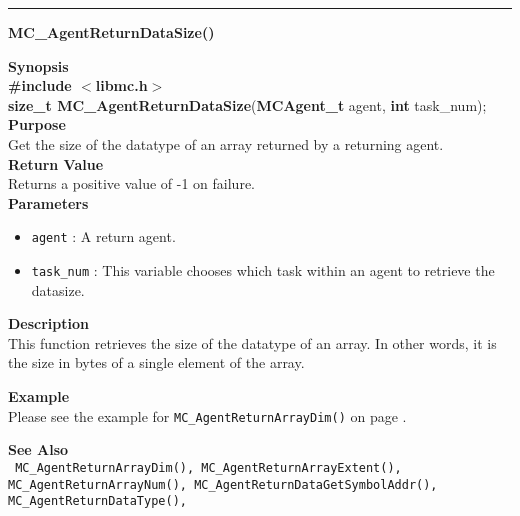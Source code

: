 \noindent
\vspace{5pt}
\rule{6.5in}{0.015in}
\noindent
{}
{\LARGE \bf MC\_AgentReturnDataSize()}\\
\label{api:MC_AgentReturnDataSize()}

\noindent
{\bf Synopsis}\\
{\bf \#include $<$libmc.h$>$}\\
{\bf size\_t MC\_AgentReturnDataSize}({\bf MCAgent\_t} agent, {\bf int} task\_num);\\

\noindent
{\bf Purpose}\\
Get the size of the datatype of an array returned by a returning agent.\\

\noindent
{\bf Return Value}\\
Returns a positive value of -1 on failure.\\

\noindent
{\bf Parameters}
\begin{itemize}
\item \texttt{agent} : A return agent.
\item \texttt{task\_num} : This variable chooses which task within an agent to
retrieve the datasize.
\end{itemize}


\noindent
{\bf Description}\\
This function retrieves the size of the datatype of an array. In other words,
it is the size in bytes of a single element of the array.

\noindent
{\bf Example}\\
\noindent
Please see the example for \texttt{MC\_AgentReturnArrayDim()} on page \pageref{api:MC_AgentReturnArrayDim()}.

\noindent
{\bf See Also}\\
\texttt{
  MC\_AgentReturnArrayDim(), MC\_AgentReturnArrayExtent(), MC\_AgentReturnArrayNum(),
  MC\_AgentReturnDataGetSymbolAddr(), MC\_AgentReturnDataType(),
}

